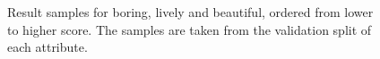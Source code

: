 \begin{figure}[ht]
	\centering
	\hspace{0mm}
	\hspace{0mm}
	\caption[Result samples]{
		Result samples for boring, lively and beautiful, ordered from lower to higher score.
		The samples are taken from the validation split of each attribute.
		}
	\label{fig:samples_2}
\end{figure}
